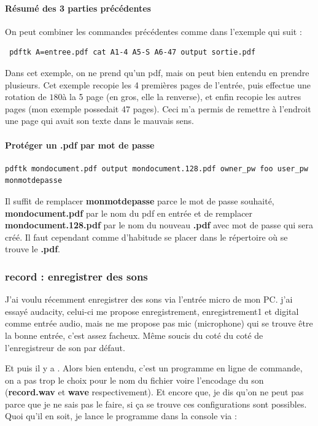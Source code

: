 \documentclass[a4paper,twoside]{article}
\begin{document}
\paragraph{Résumé des 3 parties précédentes}
On peut combiner les commandes précédentes comme dans l'exemple qui suit :
\begin{verbatim}
 pdftk A=entree.pdf cat A1-4 A5-S A6-47 output sortie.pdf
\end{verbatim}

Dans cet exemple, on ne prend qu'un pdf, mais on peut bien entendu en prendre plusieurs. Cet exemple recopie les 4 premières pages de l'entrée, puis effectue une rotation de $180$\degre à la 5\ieme{} page (en gros, elle la renverse), et enfin recopie les autres pages (mon exemple possedait 47 pages). Ceci m'a permis de remettre à l'endroit une page qui avait son texte dans le mauvais sens.\par

\paragraph{Protéger un .pdf par mot de passe}
\begin{verbatim}
pdftk mondocument.pdf output mondocument.128.pdf owner_pw foo user_pw monmotdepasse
\end{verbatim}
Il suffit de remplacer \textbf{monmotdepasse} parce le mot de passe souhaité, \textbf{mondocument.pdf} par le nom du pdf en entrée et de remplacer \textbf{mondocument.128.pdf} par le nom du nouveau \textbf{.pdf} avec mot de passe qui sera créé. Il faut cependant comme d'habitude se placer dans le répertoire où se trouve le \textbf{.pdf}.

\subsubsection{record : enregistrer des sons}
J'ai voulu récemment enregistrer des sons via l'entrée micro de mon PC. j'ai essayé audacity, celui-ci me propose enregistrement, enregistrement1 et digital comme entrée audio, mais ne me propose pas mic (microphone) qui se trouve être la bonne entrée, c'est assez facheux. Même soucis du coté du coté de l'enregistreur de son par défaut.

Et puis il y a . Alors bien entendu, c'est un programme en ligne de commande, on a pas trop le choix pour le nom du fichier voire l'encodage du son (\textbf{record.wav} et \textbf{wave} respectivement). Et encore que, je dis qu'on ne peut pas parce que je ne sais pas le faire, si ça se trouve ces configurations sont possibles. Quoi qu'il en soit, je lance le programme dans la console via :
\end{document}

